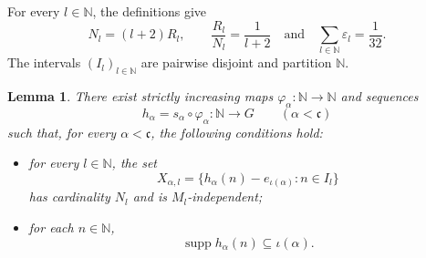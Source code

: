 \documentclass[11pt]{amsart}
\newtheorem{lemma}[theorem]{Lemma}
\theoremstyle{definition}
\newcommand{\N}{\mathbb N}
\newcommand{\cfrak}{\mathfrak c}
\newcommand{\supp}{\operatorname{supp}}
\begin{document}
For every $l\in\N$, the definitions give
\[
 N_l=(l+2)R_l,
 \qquad
 \frac{R_l}{N_l}=\frac1{l+2} \quad\text{and}\quad \sum_{l\in\N}\varepsilon_l=\frac1{32}.
\]
The intervals $(I_l)_{l\in\N}$ are pairwise disjoint and partition
$\N$.

\begin{lemma}\label{lem:independent-block-subsequences}
There exist strictly increasing maps $\varphi_\alpha:\N\to\N$ and sequences
\[
h_\alpha=s_\alpha\circ\varphi_\alpha:
\N\longrightarrow G
\qquad(\alpha<\cfrak)
\]
such that, for every $\alpha<\cfrak$, the following conditions hold:
\begin{itemize}
\item for every $l\in\N$, the set
\[
X_{\alpha,l}
=
\{h_\alpha(n)-e_{\iota(\alpha)}:n\in I_l\}
\]
has cardinality $N_l$ and is $M_l$-independent;

\item for each $n\in\N$,
\begin{equation}\label{eq:prepared-support}
 \supp h_\alpha(n)\subseteq\iota(\alpha).
\end{equation}
\end{itemize}
\end{lemma}
\end{document}
